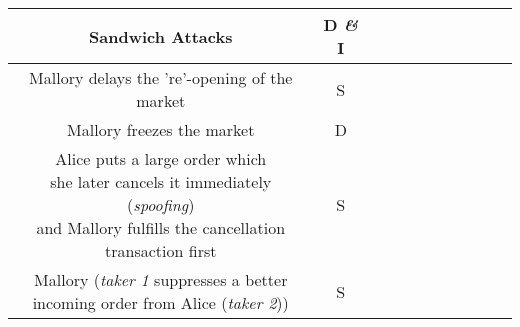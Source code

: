 \begin{table*}[t]
\begin{tabular}{|c|c|c|c|c|c|c|c|c|c|c|}
Sandwich Attacks																																		&D \textit{\&} I							&&&&&&&&&												\\ 	\hline
Mallory delays the 're'-opening of the market																													&S    			&&&&&&&&&	\\ 	\hline
Mallory freezes the market																																	&D 			&&&&&&&&&\\ 	\hline
\shortstack{Alice puts a large order which \\she later cancels it immediately (\textit{spoofing}) \\ and Mallory fulfills the cancellation transaction first} 						&S 						&&&&&&&&&	\\ 	\hline
\shortstack{Mallory (\textit{taker 1} suppresses a better \\ incoming order from Alice (\textit{taker 2}))}																		&S 							&&&&&&&&&	\\ 	\hline


\end{tabular}
\caption{\footnotesize{}
\label{tab:front}}
\end{table*}
